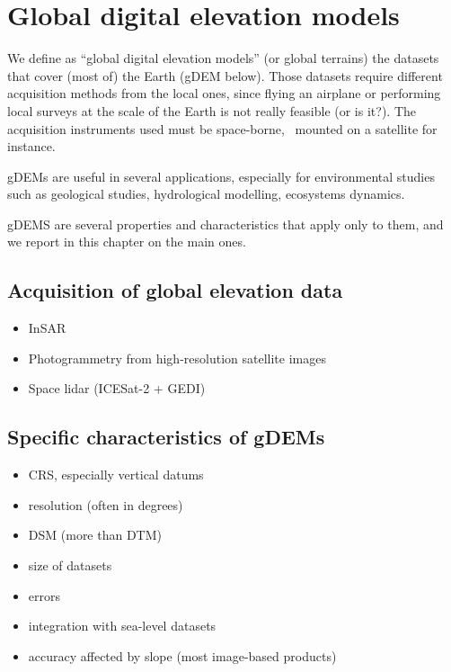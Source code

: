 
\setchapterpreamble[u]{\margintoc}
\graphicspath{{gdem/figs/}}


\chapter{Global digital elevation models}%
\label{chap:gdem}

We define as ``global digital elevation models'' (or global terrains) the datasets that cover (most of) the Earth (gDEM below).%
Those datasets require different acquisition methods from the local ones, since flying an airplane or performing local surveys at the scale of the Earth is not really feasible (or is it?).
The acquisition instruments used must be space-borne, \ie\ mounted on a satellite for instance.

gDEMs are useful in several applications, especially for environmental studies such as geological studies, hydrological modelling, ecosystems dynamics.

gDEMS are several properties and characteristics that apply only to them, and we report in this chapter on the main ones.


%
\section[Acquisition of global data]{Acquisition of global elevation data}

\begin{itemize}
  \item InSAR
  \item Photogrammetry from high-resolution satellite images
  \item Space lidar (ICESat-2 + GEDI)
\end{itemize}


%
\section[Specific characteristics]{Specific characteristics of gDEMs}

\begin{itemize}
  \item CRS, especially vertical datums
  \item resolution (often in degrees)
  \item DSM (more than DTM)
  \item size of datasets
  \item errors
  \item integration with sea-level datasets
  \item accuracy affected by slope (most image-based products)
\end{itemize}


